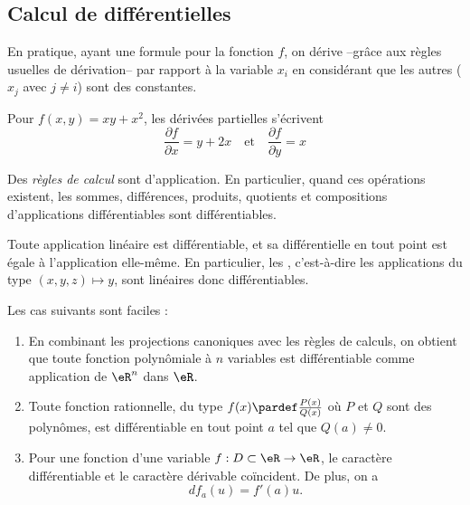                     \subsection{Calcul de différentielles}


\begin{remark}      \label{deriveepartielles}
  En pratique, ayant une formule pour la fonction $f$, on dérive --grâce aux règles usuelles de dérivation-- par rapport à la variable $x_i$ en considérant que les autres ($x_j$ avec $j \neq i$) sont des constantes.
\end{remark}

\begin{example}Pour $f(x,y) = xy + x^2$, les dérivées partielles
  s'écrivent
  \begin{equation*}
    \frac{\partial f}{\partial x} = y + 2x \quad\text{et}\quad \frac{\partial f}{\partial y} = x
  \end{equation*}
\end{example}


Des \emph{règles de calcul} sont d'application. En particulier, quand
ces opérations existent, les sommes, différences, produits, quotients
et compositions d'applications différentiables sont différentiables.

Toute application linéaire est différentiable, et sa différentielle en
tout point est égale à l'application elle-même. En particulier, les
, c'est-à-dire les applications du type
$(x,y,z) \mapsto y$, sont linéaires donc différentiables.

\begin{example}
Les cas suivants sont faciles :
  \begin{enumerate}
  \item En combinant les projections canoniques avec les règles de
    calculs, on obtient que toute fonction polynômiale à $n$ variables
    est différentiable comme application de $\eR^n$ dans $\eR$.

  \item Toute fonction rationnelle, du type $f(x) \pardef
    \frac{P(x)}{Q(x)}$ où $P$ et $Q$ sont des polynômes, est
    différentiable en tout point $a$ tel que $Q(a) \neq 0$.

  \item Pour une fonction d'une variable $f : D \subset \eR \to
    \eR$, le caractère différentiable et le caractère dérivable
    coïncident. De plus, on a
    \begin{equation*}
      d f_a(u) = f'(a) u.
    \end{equation*}
  \end{enumerate}
\end{example}

